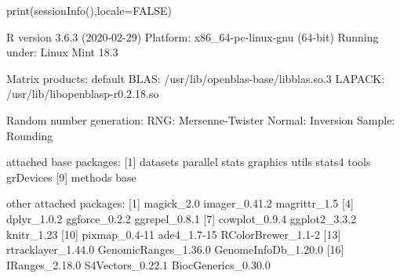 \documentclass[a4paper,10pt]{article}
\begin{document}
\begin{Schunk}
\begin{Sinput}
  print(sessionInfo(),locale=FALSE)
\end{Sinput}
\begin{Soutput}
R version 3.6.3 (2020-02-29)
Platform: x86_64-pc-linux-gnu (64-bit)
Running under: Linux Mint 18.3

Matrix products: default
BLAS:   /usr/lib/openblas-base/libblas.so.3
LAPACK: /usr/lib/libopenblasp-r0.2.18.so

Random number generation:
 RNG:     Mersenne-Twister 
 Normal:  Inversion 
 Sample:  Rounding 
 
attached base packages:
 [1] datasets  parallel  stats     graphics  utils     stats4    tools     grDevices
 [9] methods   base     

other attached packages:
 [1] magick_2.0           imager_0.41.2        magrittr_1.5        
 [4] dplyr_1.0.2          ggforce_0.2.2        ggrepel_0.8.1       
 [7] cowplot_0.9.4        ggplot2_3.3.2        knitr_1.23          
[10] pixmap_0.4-11        ade4_1.7-15          RColorBrewer_1.1-2  
[13] rtracklayer_1.44.0   GenomicRanges_1.36.0 GenomeInfoDb_1.20.0 
[16] IRanges_2.18.0       S4Vectors_0.22.1     BiocGenerics_0.30.0 


\end{Soutput}
\end{Schunk}
\end{document}
